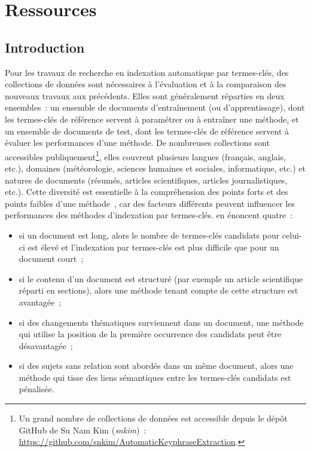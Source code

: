 \chapter{Ressources}
\label{chap:main-data_description}

  \section{Introduction}
  \label{sec:main-data_description-introduction}
    Pour les travaux de recherche en indexation automatique par termes-clés, des
    collections de données sont nécessaires à l'évaluation et à la comparaison
    des nouveaux travaux aux précédents. Elles sont généralement réparties en
    deux ensembles~: un ensemble de documents d'entraînement (ou
    d'apprentissage), dont les termes-clés de référence servent à paramétrer ou
    à entraîner une méthode, et un ensemble de documents de test, dont les
    termes-clés de référence servent à évaluer les performances d'une méthode.
    De nombreuses collections sont accessibles publiquement\footnote{Un grand
    nombre de collections de données est accessible depuis le dépôt GitHub de Su
    Nam Kim (\textit{snkim})~:
    \url{https://github.com/snkim/AutomaticKeyphraseExtraction}.}, elles
    couvrent plusieurs langues (français, anglais, etc.), domaines
    (météorologie, sciences humaines et sociales, informatique, etc.) et natures
    de documents (résumés, articles scientifiques, articles journalistiques,
    etc.). Cette diversité est essentielle à la compréhension des points forts
    et des points faibles d'une méthode~\cite{hassan2010conundrums}, car des
    facteurs différents peuvent influencer les performances des méthodes
    d'indexation par termes-clés.  en
    énoncent quatre~:
    \begin{itemize}
      \item{si un document est long, alors le nombre de termes-clés candidats
            pour celui-ci est élevé et l'indexation par termes-clés est plus
            difficile que pour un document court~;}
      \item{si le contenu d'un document est structuré (par exemple un article
            scientifique réparti en sections), alors une méthode tenant compte
            de cette structure est avantagée~;}
      \item{si des changements thématiques surviennent dans un document, une
            méthode qui utilise la position de la première occurrence des
            candidats peut être désavantagée~;}
      \item{si des sujets sans relation sont abordés dans un même document,
            alors une méthode qui tisse des liens sémantiques entre les
            termes-clés candidats est pénalisée.}
    \end{itemize}
